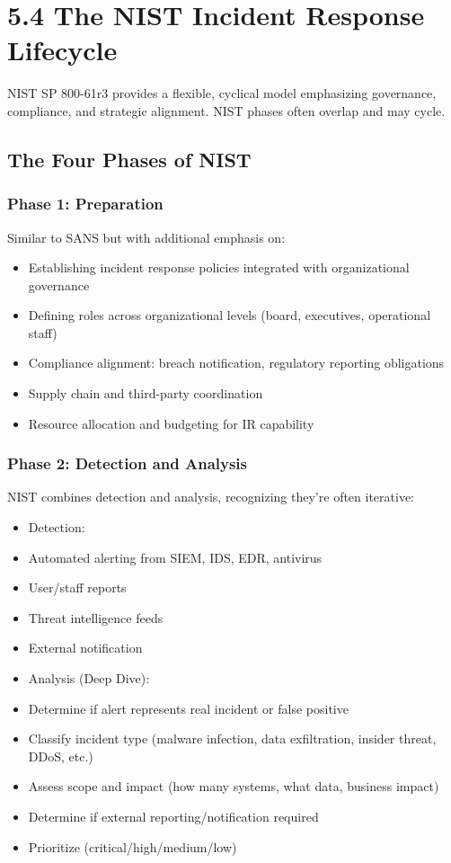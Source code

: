 \documentclass[10pt]{article}
\begin{document}
\section*{5.4 The NIST Incident Response Lifecycle}
NIST SP 800-61r3 provides a flexible, cyclical model emphasizing governance, compliance, and strategic alignment. NIST phases often overlap and may cycle.

\subsection*{The Four Phases of NIST}
\subsubsection*{Phase 1: Preparation}
Similar to SANS but with additional emphasis on:

\begin{itemize}
  \item Establishing incident response policies integrated with organizational governance
  \item Defining roles across organizational levels (board, executives, operational staff)
  \item Compliance alignment: breach notification, regulatory reporting obligations
  \item Supply chain and third-party coordination
  \item Resource allocation and budgeting for IR capability
\end{itemize}

\subsubsection*{Phase 2: Detection and Analysis}
NIST combines detection and analysis, recognizing they're often iterative:

\begin{itemize}
  \item Detection:
  \item Automated alerting from SIEM, IDS, EDR, antivirus
  \item User/staff reports
  \item Threat intelligence feeds
  \item External notification
  \item Analysis (Deep Dive):
  \item Determine if alert represents real incident or false positive
  \item Classify incident type (malware infection, data exfiltration, insider threat, DDoS, etc.)
  \item Assess scope and impact (how many systems, what data, business impact)
  \item Determine if external reporting/notification required
  \item Prioritize (critical/high/medium/low)
\end{itemize}
\end{document}
